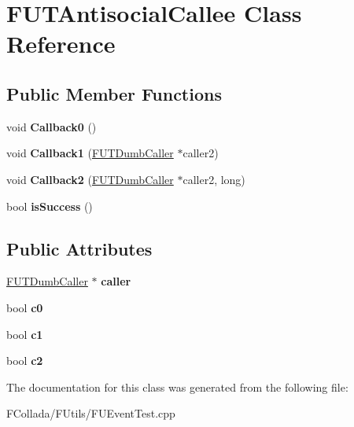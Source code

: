 \hypertarget{classFUTAntisocialCallee}{
\section{FUTAntisocialCallee Class Reference}
\label{classFUTAntisocialCallee}
}
\subsection*{Public Member Functions}
\begin{DoxyCompactItemize}
\item 
\hypertarget{classFUTAntisocialCallee_a0eb2f685246ada963a0974b6161afa8d}{
void {\bfseries Callback0} ()}
\label{classFUTAntisocialCallee_a0eb2f685246ada963a0974b6161afa8d}

\item 
\hypertarget{classFUTAntisocialCallee_a1a3b35cf0168800ed5313d89b784be42}{
void {\bfseries Callback1} (\hyperlink{classFUTDumbCaller}{FUTDumbCaller} $\ast$caller2)}
\label{classFUTAntisocialCallee_a1a3b35cf0168800ed5313d89b784be42}

\item 
\hypertarget{classFUTAntisocialCallee_afd0e0e3c9e10a007ccbba5c92f2dbf9e}{
void {\bfseries Callback2} (\hyperlink{classFUTDumbCaller}{FUTDumbCaller} $\ast$caller2, long)}
\label{classFUTAntisocialCallee_afd0e0e3c9e10a007ccbba5c92f2dbf9e}

\item 
\hypertarget{classFUTAntisocialCallee_af4cfcc08f9b546dbc6d15d8a74a98ea1}{
bool {\bfseries isSuccess} ()}
\label{classFUTAntisocialCallee_af4cfcc08f9b546dbc6d15d8a74a98ea1}

\end{DoxyCompactItemize}
\subsection*{Public Attributes}
\begin{DoxyCompactItemize}
\item 
\hypertarget{classFUTAntisocialCallee_ad89c4b8acfe7e80ce4046e59173a0f86}{
\hyperlink{classFUTDumbCaller}{FUTDumbCaller} $\ast$ {\bfseries caller}}
\label{classFUTAntisocialCallee_ad89c4b8acfe7e80ce4046e59173a0f86}

\item 
\hypertarget{classFUTAntisocialCallee_abc12ecab8becd506c9ea935da1fe9783}{
bool {\bfseries c0}}
\label{classFUTAntisocialCallee_abc12ecab8becd506c9ea935da1fe9783}

\item 
\hypertarget{classFUTAntisocialCallee_a14093a5a90705772e4d32a6b88c66ad8}{
bool {\bfseries c1}}
\label{classFUTAntisocialCallee_a14093a5a90705772e4d32a6b88c66ad8}

\item 
\hypertarget{classFUTAntisocialCallee_a1e2b492258b3614d5e68fa1c79c55284}{
bool {\bfseries c2}}
\label{classFUTAntisocialCallee_a1e2b492258b3614d5e68fa1c79c55284}

\end{DoxyCompactItemize}


The documentation for this class was generated from the following file:\begin{DoxyCompactItemize}
\item 
FCollada/FUtils/FUEventTest.cpp\end{DoxyCompactItemize}
